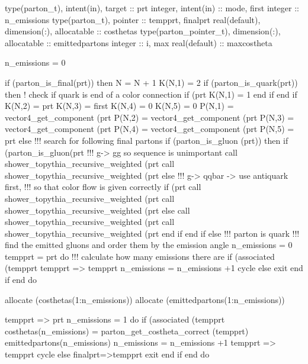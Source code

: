     type(parton_t), intent(in), target :: prt
    integer, intent(in) :: mode, first
    integer :: n_emissions
    type(parton_t), pointer :: tempprt, finalprt
    real(default), dimension(:), allocatable :: costhetas
    type(parton_pointer_t), dimension(:), allocatable :: emittedpartons
    integer :: i, max
    real(default) :: maxcostheta

    n_emissions = 0

    if (parton_is_final(prt)) then
       N = N + 1
       K(N,1) = 2
       if (parton_is_quark(prt)) then
          ! check if quark is end of a color connection
          if (prt%
             K(N,1) = 1
          end if
       end if
       K(N,2) = prt%
       K(N,3) = first
       K(N,4) = 0
       K(N,5) = 0
       P(N,1) = vector4_get_component (prt%
       P(N,2) = vector4_get_component (prt%
       P(N,3) = vector4_get_component (prt%
       P(N,4) = vector4_get_component (prt%
       P(N,5) = prt%
    else
       !!! search for following final partons
       if (parton_is_gluon (prt)) then
          if (parton_is_gluon(prt%
             !!! g-> gg so sequence is unimportant
             call shower_topythia_recursive_weighted (prt%
             call shower_topythia_recursive_weighted (prt%
          else
             !!! g-> qqbar -> use antiquark first,
             !!!       so that color flow is given correctly
             if (prt%
                call shower_topythia_recursive_weighted (prt%
                call shower_topythia_recursive_weighted (prt%
             else
                call shower_topythia_recursive_weighted (prt%
                call shower_topythia_recursive_weighted (prt%
             end if
          end if
       else
          !!! parton is quark
          !!! find the emitted gluons and order them by the emission angle
          n_emissions = 0
          tempprt = prt
          do
             !!! calculate how many emissions there are
             if (associated (tempprt%
                tempprt => tempprt%
                n_emissions = n_emissions +1
                cycle
             else
                exit
             end if
          end do

          allocate (costhetas(1:n_emissions))
          allocate (emittedpartons(1:n_emissions))

          tempprt => prt
          n_emissions = 1
          do
             if (associated (tempprt%
                costhetas(n_emissions) = parton_get_costheta_correct (tempprt)
                emittedpartons(n_emissions)%
                n_emissions = n_emissions +1
                tempprt => tempprt%
                cycle
             else
                finalprt=>tempprt
                exit
             end if
          end do

